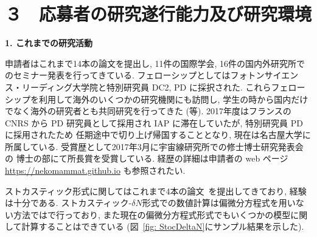 \documentclass[11pt,a4j,dvipdfmx]{jarticle} 					%
\newcommand{\研究課題名}{\mgfamily\sffamily ストカスティック形式で迫る重力と量子論}
\newcommand{\研究機関名}{\mgfamily\sffamily 名古屋大学}
\newcommand{\研究代表者氏名}{\mgfamily\sffamily 多田祐一郎}
\newcommand{\研究期間の最終元号年度}{34}  %
\begin{document}

\section{３　応募者の研究遂行能力及び研究環境}


\begin{mdframed}[roundcorner=0.5zw,
	innertopmargin=0.8zw,innerbottommargin=0.8zw,
	linecolor=black!50,linewidth=0.2zw,
	backgroundcolor=black!10]
	{\bfseries\gtfamily\sffamily\large 1. これまでの研究活動}
\end{mdframed}

申請者はこれまで14本の論文を提出し, 11件の国際学会, 16件の国内外研究所でのセミナー発表を行ってきている.
フェローシップとしてはフォトンサイエンス・リーディング大学院と特別研究員 DC2, PD に採択された.
これらフェローシップを利用して海外のいくつかの研究機関にも訪問し, 学生の時から国内だけでなく海外の研究者とも共同研究を行ってきた 
(\cite{Tada:2016pmk}等). 2017年度はフランスの CNRS から PD 研究員として採用され IAP に滞在していたが, 特別研究員 PD に採用されたため
任期途中で切り上げ帰国することとなり, 現在は名古屋大学に所属している. 受賞歴として2017年3月に宇宙線研究所での修士博士研究発表会の
博士の部にて所長賞を受賞している.
経歴の詳細は申請者の web ページ \url{https://nekomammat.github.io} も参照されたい.

ストカスティック形式に関してはこれまで4本の論文~\cite{Fujita:2013cna,Fujita:2014tja,Kawasaki:2015ppx,Pinol:2018euk}を提出してきており,
経験は十分である. ストカスティック-$\delta N$形式での数値計算は偏微分方程式を用いない方法では\cite{Fujita:2014tja,Kawasaki:2015ppx}で行っており,
また現在の偏微分方程式形式でもいくつかの模型に関して計算することはできている (図~\ref{fig: StocDeltaN}にサンプル結果を示した).
\end{document}
